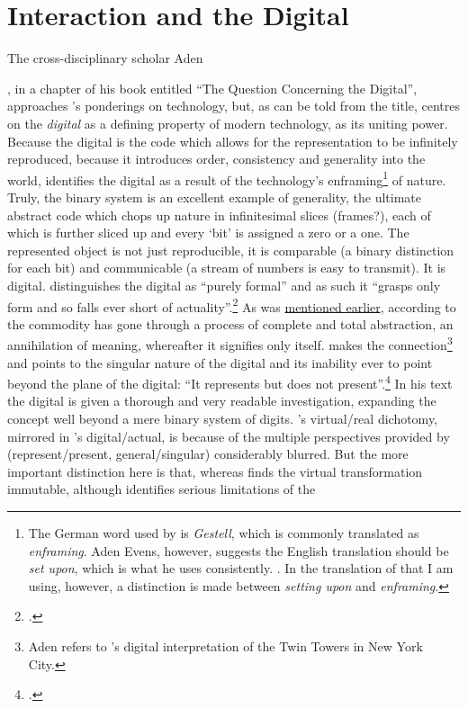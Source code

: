 \section{Interaction and the Digital}
\label{sec:interaction-digital}


\hypertarget{interaction-digital}{The cross-disciplinary scholar Aden \citeauthor{evens05}}, in a chapter of his book  entitled ``The  Question Concerning the Digital'', approaches \citeauthor{heidegger93}'s ponderings on technology, but, as can be told from the title, centres on the \emph{digital} as a defining property of modern technology, as its uniting power. Because the digital is the code which allows for the representation to be infinitely reproduced, because it introduces order, consistency and generality into the world, \citeauthor{evens05} identifies the digital as a result of the technology's enframing\footnote{The German word used by \citeauthor{heidegger93} is \emph{Gestell}, which is commonly translated as \emph{enframing}. Aden Evens, however, suggests the English translation should be \emph{set upon}, which is what he uses consistently. \cite[See][182n2]{evens05}. In the translation of  that I am using, however, a distinction is made between \emph{setting upon} and \emph{enframing}.} of nature. Truly, the binary system is an excellent example of generality, the ultimate abstract code which chops up nature in infinitesimal slices (frames?), each of which is further sliced up and every `bit' is assigned a zero or a one. The represented object is not just reproducible, it is comparable (a binary distinction for each bit) and communicable (a stream of numbers is easy to transmit). It is digital. \citeauthor{evens05} distinguishes the digital as ``purely formal'' and as such it ``grasps only form and so falls ever short of actuality''.\footcite[66]{evens05}  As was \hyperlink{sec:human-comp-inter:par5}{mentioned earlier}, according to \citeauthor{baudrillard02} the commodity has gone through a process of complete and total abstraction, an annihilation of meaning, whereafter it signifies only itself. \citeauthor{evens05} makes the connection\footnote{Aden \citeauthor{evens05} refers to \citeauthor{baudrillard02}'s digital interpretation of the Twin Towers in New York City.} and points to the singular nature of the digital and its inability ever to point beyond the plane of the digital: ``It represents but does not present''.\footcite[76]{evens05} In his text the digital is given a thorough and very readable investigation, expanding the concept well beyond a mere binary system of digits. \citeauthor{baudrillard96}'s virtual/real dichotomy, mirrored in \citeauthor{evens05}'s digital/actual, is because of the multiple perspectives provided by \citeauthor{evens05} (represent/present, general/singular) considerably blurred. But the more important distinction here is that, whereas \citeauthor{baudrillard96} finds the virtual transformation immutable, although \citeauthor{evens05} identifies serious limitations of the 